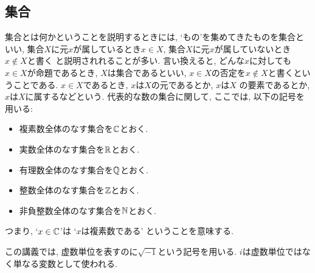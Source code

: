 \subsection{集合}
集合とは何かということを説明するときには,
`もの'を集めてきたものを集合といい,
集合$X$に元$x$が属しているとき$x\in X$,
集合$X$に元$x$が属していないとき$x\not\in X$と書く
と説明されれることが多い.
言い換えると,
どんな$x$に対しても$x\in X$が命題であるとき,
$X$は集合であるといい,
$x\in X$の否定を$x\not\in X$と書くということである.
$x\in X$であるとき,
$x$は$X$の元であるとか,
$x$は$X$ の要素であるとか,
$x$は$X$に属するなどという.
代表的な数の集合に関して,
ここでは,
以下の記号を用いる:
\begin{itemize}
\item 複素数全体のなす集合を$\mathbb{C}$とおく.
\item 実数全体のなす集合を$\mathbb{R}$とおく.
\item 有理数全体のなす集合を$\mathbb{Q}$とおく.
\item 整数全体のなす集合を$\mathbb{Z}$とおく.
\item 非負整数全体のなす集合を$\mathbb{N}$とおく.
\end{itemize}
つまり,
`$x\in\mathbb{C}$'は
`$x$は複素数である'
ということを意味する.
\begin{remark}
この講義では, 虚数単位を表すのに$\sqrt{-1}$という記号を用いる.
$i$は虚数単位ではなく単なる変数として使われる.
\end{remark}

